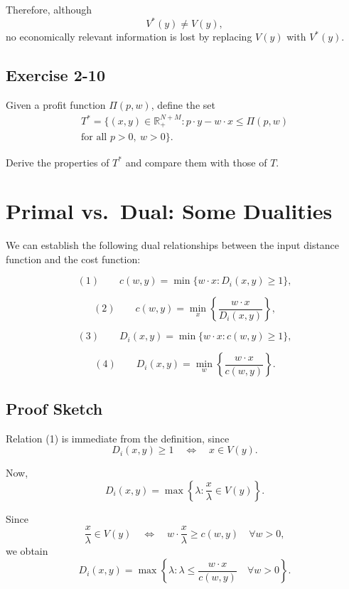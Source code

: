 \medskip

Therefore, although
\[
V^*(y) \ne V(y),
\]
no economically relevant information is lost by replacing $V(y)$ with $V^*(y)$.

\begin{tcolorbox}[breakable]

\subsection*{Exercise 2-10}

Given a profit function $\Pi(p,w)$, define the set
\[
\begin{aligned}
T^*
=
\{(x,y)\in \mathbb{R}_+^{N+M} : p\cdot y - w\cdot x \le \Pi(p,w)\\
\text{for all } p>0,\ w>0\}.
\end{aligned}
\]

Derive the properties of $T^*$ and compare them with those of $T$.

\end{tcolorbox}

\section{Primal vs.\ Dual: Some Dualities}

We can establish the following dual relationships between the input
distance function and the cost function:

\[
(1)\qquad
c(w,y)
=
\min \{w\cdot x : D_i(x,y)\ge 1\},
\]

\[
(2)\qquad
c(w,y)
=
\min_x \left\{ \frac{w\cdot x}{D_i(x,y)} \right\},
\]

\[
(3)\qquad
D_i(x,y)
=
\min \{ w\cdot x : c(w,y)\ge 1\},
\]

\[
(4)\qquad
D_i(x,y)
=
\min_w \left\{ \frac{w\cdot x}{c(w,y)} \right\}.
\]

\subsection*{Proof Sketch}

Relation (1) is immediate from the definition, since
\[
D_i(x,y)\ge 1
\quad \Longleftrightarrow \quad
x \in V(y).
\]

Now,
\[
D_i(x,y)
=
\max \left\{ \lambda : \frac{x}{\lambda}\in V(y) \right\}.
\]

Since
\[
\frac{x}{\lambda}\in V(y)
\quad \Longleftrightarrow \quad
w\cdot \frac{x}{\lambda} \ge c(w,y)
\quad \forall w>0,
\]
we obtain
\[
D_i(x,y)
=
\max \left\{ \lambda : \lambda \le \frac{w\cdot x}{c(w,y)}
\quad \forall w>0 \right\}.
\]

